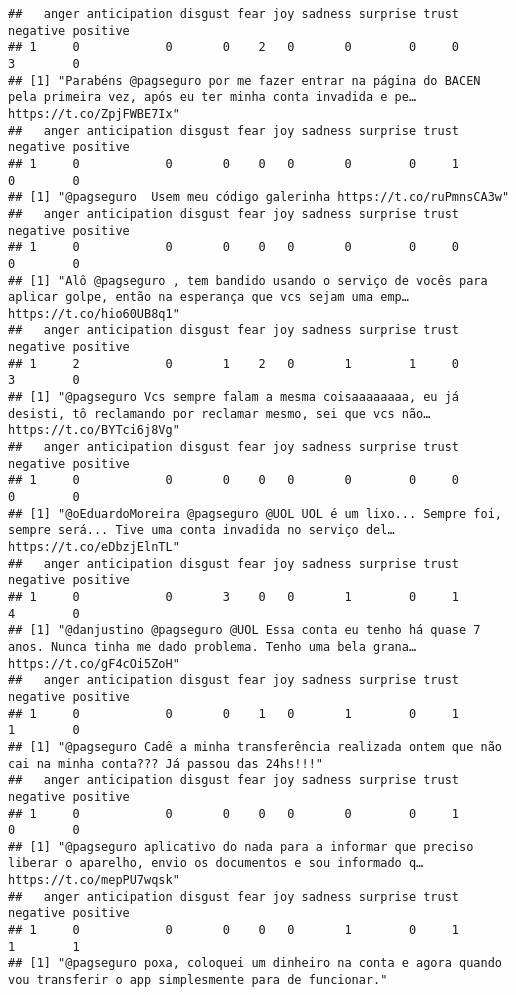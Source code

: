 \documentclass[
]{article}
\begin{document}
\begin{verbatim}
##   anger anticipation disgust fear joy sadness surprise trust negative positive
## 1     0            0       0    2   0       0        0     0        3        0
## [1] "Parabéns @pagseguro por me fazer entrar na página do BACEN pela primeira vez, após eu ter minha conta invadida e pe… https://t.co/ZpjFWBE7Ix"
##   anger anticipation disgust fear joy sadness surprise trust negative positive
## 1     0            0       0    0   0       0        0     1        0        0
## [1] "@pagseguro  Usem meu código galerinha https://t.co/ruPmnsCA3w"
##   anger anticipation disgust fear joy sadness surprise trust negative positive
## 1     0            0       0    0   0       0        0     0        0        0
## [1] "Alô @pagseguro , tem bandido usando o serviço de vocês para aplicar golpe, então na esperança que vcs sejam uma emp… https://t.co/hio60UB8q1"
##   anger anticipation disgust fear joy sadness surprise trust negative positive
## 1     2            0       1    2   0       1        1     0        3        0
## [1] "@pagseguro Vcs sempre falam a mesma coisaaaaaaaa, eu já desisti, tô reclamando por reclamar mesmo, sei que vcs não… https://t.co/BYTci6j8Vg"
##   anger anticipation disgust fear joy sadness surprise trust negative positive
## 1     0            0       0    0   0       0        0     0        0        0
## [1] "@oEduardoMoreira @pagseguro @UOL UOL é um lixo... Sempre foi, sempre será... Tive uma conta invadida no serviço del… https://t.co/eDbzjElnTL"
##   anger anticipation disgust fear joy sadness surprise trust negative positive
## 1     0            0       3    0   0       1        0     1        4        0
## [1] "@danjustino @pagseguro @UOL Essa conta eu tenho há quase 7 anos. Nunca tinha me dado problema. Tenho uma bela grana… https://t.co/gF4cOi5ZoH"
##   anger anticipation disgust fear joy sadness surprise trust negative positive
## 1     0            0       0    1   0       1        0     1        1        0
## [1] "@pagseguro Cadê a minha transferência realizada ontem que não cai na minha conta??? Já passou das 24hs!!!"
##   anger anticipation disgust fear joy sadness surprise trust negative positive
## 1     0            0       0    0   0       0        0     1        0        0
## [1] "@pagseguro aplicativo do nada para a informar que preciso liberar o aparelho, envio os documentos e sou informado q… https://t.co/mepPU7wqsk"
##   anger anticipation disgust fear joy sadness surprise trust negative positive
## 1     0            0       0    0   0       1        0     1        1        1
## [1] "@pagseguro poxa, coloquei um dinheiro na conta e agora quando vou transferir o app simplesmente para de funcionar."

\end{verbatim}
\end{document}

